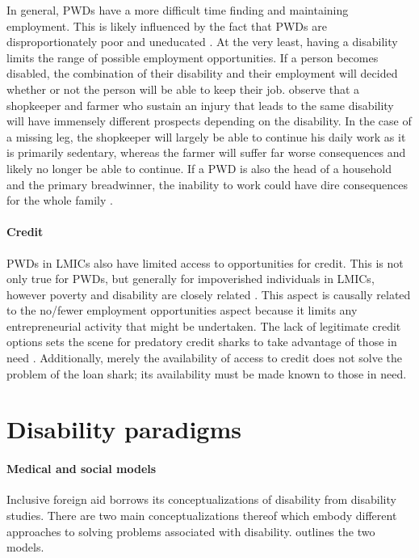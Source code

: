 \documentclass[a4paper]{article}
\begin{document}
In general, PWDs have a more difficult time finding and maintaining
employment. This is likely influenced by the fact that PWDs are
disproportionately poor and uneducated \citep{lamichhane2014nexus}. At the very
least, having a disability limits the range of possible employment
opportunities. If a person becomes disabled, the combination of their
disability and their employment will decided whether or not the person will be
able to keep their job. \cite{chowdhury2006economics} observe that a
shopkeeper and farmer who sustain an injury that leads to the same disability
will have immensely different prospects depending on the disability. In the
case of a missing leg, the shopkeeper will largely be able to continue his
daily work as it is primarily sedentary, whereas the farmer will suffer far
worse consequences and likely no longer be able to continue. If a PWD is also
the head of a household and the primary breadwinner, the inability to work
could have dire consequences for the whole family \citep{world2011world}.

\paragraph{Credit}

PWDs in LMICs also have limited access to opportunities for credit. This is
not only true for PWDs, but generally for impoverished individuals in LMICs,
however poverty and disability are closely related
\citep{palmer2011disability}. This aspect is causally related to the no/fewer
employment opportunities aspect because it limits any entrepreneurial activity
that might be undertaken. The lack of legitimate credit options sets the scene
for predatory credit sharks to take advantage of those in need
\citep{beisland2017exploring}. Additionally, merely the availability of access
to credit does not solve the problem of the loan shark; its availability must
be made known to those in need.

\newpage
\section{Disability paradigms}
\label{models}

\paragraph{Medical and social models} 

Inclusive foreign aid borrows its conceptualizations of disability from
disability studies. There are two main conceptualizations thereof which embody
different approaches to solving problems associated with disability.
\cite{winter2003development} outlines the two models.
\end{document}
